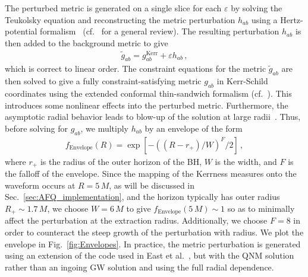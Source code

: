 The perturbed metric is generated on a single slice for each $\varepsilon$ by solving the Teukolsky equation and reconstructing the metric perturbation $h_{ab}$ using a Hertz-potential formalism~\cite{Yang:2014tla, Lousto:2002em} (cf.~\cite{Teukolsky:2014vca} for a general review). The resulting perturbation $h_{ab}$ is then added to the background metric to give 
\begin{align}
\label{eq:perturbation}
\tilde g_{ab} = g_{ab}^\mathrm{Kerr} + \varepsilon h_{ab}\,,
\end{align}
which is correct to linear order. The constraint equations for the metric $\tilde g_{ab}$ are then solved to give a fully constraint-satisfying metric $g_{ab}$ in Kerr-Schild coordinates using the extended conformal thin-sandwich formalism (cf.~\cite{baumgarteShapiroBook}).%
This introduces some nonlinear effects into the perturbed metric. Furthermore, the asymptotic radial behavior leads to blow-up of the solution at large radii~\cite{Ori:2002uv}. Thus, before solving for $g_{ab}$, we multiply $h_{ab}$ by an envelope of the form 
\begin{align}
\label{eq:envelope}
f_\mathrm{Envelope}(R) = \exp[-((R - r_+)/W)^F/2] \,,
\end{align}
where $r_+$ is the radius of the outer horizon of the BH, $W$ is the width, and $F$ is the falloff of the envelope. Since the mapping of the Kerrness measures onto the waveform occurs at  $R=5\,M$, as will be discussed in Sec.~\ref{sec:AFQ_implementation}, and the horizon typically has outer radius $R_+ \sim 1.7\,M$, we choose $W = 6\,M$ to give $f_\mathrm{Envelope}(5\,M) \sim 1$ so as to minimally affect the perturbation at the extraction radius. Additionally, we choose $F = 8$ in order to counteract the steep growth of the perturbation with radius. We plot the envelope in Fig.~\ref{fig:Envelopes}. In practice, the metric perturbation is generated using an extension of the code used in East et al.~\cite{East:2013mfa}, but with the QNM solution rather than an ingoing GW solution and using the full radial dependence. 



